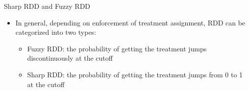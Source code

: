 \documentclass[hyperref={pdfpagelabels=false}]{beamer}
\begin{document}
\begin{frame}{Sharp RDD and Fuzzy RDD}{}
	
	\begin{itemize} 
		
		\item In general, depending on enforcement of treatment assignment, RDD can be categorized into two types:
		
				\begin{itemize} 	
		\vspace{0.2cm}
		
				\item[1] {\color{blue}Fuzzy RDD}: the probability of getting the treatment jumps discontinuously at the cutoff 
		\vspace{0.2cm}
		
		\item[2] {\color{blue}Sharp RDD}: the probability of getting the treatment jumps from 0 to 1 at the cutoff 

%			
%			
		\vspace{0.2cm}
		

%			
		
			\end{itemize}
		
	\end{itemize}
\end{frame}
\end{document}
